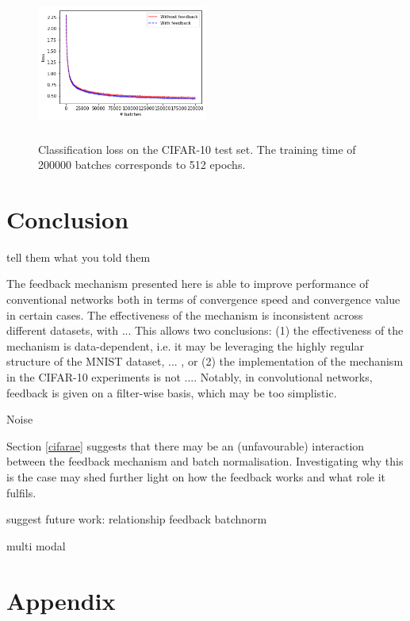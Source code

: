 \documentclass{article}
\begin{document}
\begin{figure}
      \centering
      \includegraphics[width=0.5\textwidth,height=5cm,keepaspectratio]{img/cifar_class_test_loss.png}
      \caption{Classification loss on the CIFAR-10 test set. The training time of 200000 batches corresponds to 512 epochs.}
      \label{fig:cifarclass}
  \end{figure}
  
\section{Conclusion}
tell them what you told them 

The feedback mechanism presented here is able to improve performance of conventional networks both in terms of convergence speed and convergence value in certain cases. The effectiveness of the mechanism is inconsistent across different datasets, with ...
This allows two conclusions: (1) the effectiveness of the mechanism is data-dependent, i.e. it may be leveraging the highly regular structure of the MNIST dataset, ... , or (2) the implementation of the mechanism in the CIFAR-10 experiments is not .... Notably, in convolutional networks, feedback is given on a filter-wise basis, which may be too simplistic.  


Noise


Section \ref{cifarae} suggests that there may be an (unfavourable) interaction between the feedback mechanism and batch normalisation. Investigating why this is the case may shed further light on how the feedback works and what role it fulfils. 



suggest future work: relationship feedback batchnorm 

multi modal 





\newpage
\clearpage

\section{Appendix}
\end{document}
